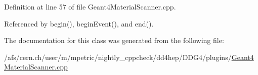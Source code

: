 Definition at line 57 of file Geant4\+Material\+Scanner.\+cpp.



Referenced by begin(), begin\+Event(), and end().



The documentation for this class was generated from the following file\+:\begin{DoxyCompactItemize}
\item 
/afs/cern.\+ch/user/m/mpetric/nightly\+\_\+cppcheck/dd4hep/\+D\+D\+G4/plugins/\hyperlink{_geant4_material_scanner_8cpp}{Geant4\+Material\+Scanner.\+cpp}\end{DoxyCompactItemize}

